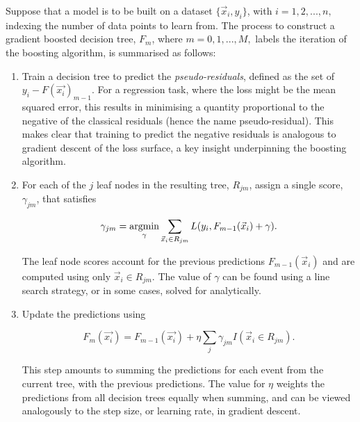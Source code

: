 Suppose that a model is to be built on a dataset $\{\vec{x}_{i},y_{i}\}$, with $i=1,2, ..., n,$ indexing the number of data points to learn from. The process to construct a gradient boosted decision tree, $F_{m}$, where $m=0,1, ..., M,$ labels the iteration of the boosting algorithm, is summarised as follows: %

\begin{enumerate}
        
 
        \item  Train a decision tree to predict the \textit{pseudo-residuals}, defined as the set of $y_{i}-F(\vec{x_{i}})_{m-1}$. For a regression task, where the loss might be the mean squared error, this results in minimising a quantity proportional to the negative of the classical residuals (hence the name pseudo-residual). This makes clear that training to predict the negative residuals is analogous to gradient descent of the loss surface, a key insight underpinning the boosting algorithm. %
        
        \item For each of the $j$ leaf nodes in the resulting tree, $R_{jm}$, assign a single score, $\gamma_{jm}$, that satisfies
        
        \begin{equation}\label{eqn:hee_boosting_2B}
        \gamma_{jm} = \operatorname*{argmin}_{\gamma} \sum_{\vec{x}_{i}\in R_{jm}} L(y_{i}, F_{m-1}(\vec{x}_{i})+\gamma).
        \end{equation}
        
        
        \noindent The leaf node scores account for the previous predictions $F_{m-1}(\vec{x}_{i})$ and are computed using only $\vec{x}_{i}\in R_{jm}$. The value of $\gamma$ can be found using a line search strategy, or in some cases, solved for analytically. %
        
        \item Update the predictions using
        
        \begin{equation}
            F_{m}(\vec{x_{i}}) = F_{m-1}(\vec{x_{i}}) + \eta \sum_{j}\gamma_{jm} I(\vec{x}_{i}\in R_{jm}).
        \end{equation} %
        
       \noindent This step amounts to summing the predictions for each event from the current tree, with the previous predictions. The value for $\eta$ weights the predictions from all decision trees equally when summing, and can be viewed analogously to the step size, or learning rate, in gradient descent. 


\end{enumerate}

